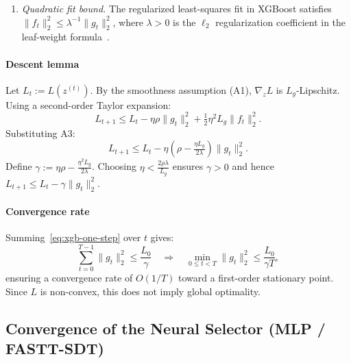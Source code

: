 \documentclass[journal]{IEEEtran}
\begin{document}
\begin{enumerate}[label=A\arabic{*}., leftmargin=2.0em]
        \item \emph{Quadratic fit bound.} The regularized least-squares fit in
            XGBoost satisfies
            $\|f_{t}\|_{2}^{2}\le \lambda^{-1}\|g_{t}\|_{2}^{2}$, where $\lambda
            > 0$ is the $\ell_{2}$ regularization coefficient in the leaf-weight
            formula~\cite{chen2016xgboost}.
    \end{enumerate}

    \paragraph{Descent lemma}
    Let $L_{t}:= L(z^{(t)})$. By the smoothness assumption (A1), $\nabla_{z}L$
    is $L_{g}$-Lipschitz. Using a second-order Taylor expansion:
    \[
        L_{t+1}\le L_{t}- \eta \rho \|g_{t}\|_{2}^{2}+ \tfrac{1}{2}\eta^{2}L_{g}\|
        f_{t}\|_{2}^{2}.
    \]
    Substituting A3:
    \[
        L_{t+1}\le L_{t}- \eta \left(\rho - \tfrac{\eta L_g}{2\lambda}\right) \|
        g_{t}\|_{2}^{2}. \tag{6}\label{eq:xgb-one-step}
    \]
    Define $\gamma := \eta\rho - \tfrac{\eta^2 L_g}{2\lambda}$. Choosing
    $\eta < \tfrac{2 \rho \lambda}{L_g}$ ensures $\gamma > 0$ and hence
    $L_{t+1}\le L_{t}- \gamma \|g_{t}\|_{2}^{2}$.

    \paragraph{Convergence rate}
    Summing~\eqref{eq:xgb-one-step} over $t$ gives:
    \[
        \sum_{t=0}^{T-1}\|g_{t}\|_{2}^{2}\le \frac{L_{0}}{\gamma}\quad \Rightarrow
        \quad \min_{0 \le t < T}\|g_{t}\|_{2}^{2}\le \frac{L_{0}}{\gamma T},
    \]
    ensuring a convergence rate of $O(1/T)$ toward a first-order stationary point.
    Since $L$ is non-convex, this does not imply global optimality.

    \subsection{Convergence of the Neural Selector (MLP / FASTT-SDT)}
\end{document}
